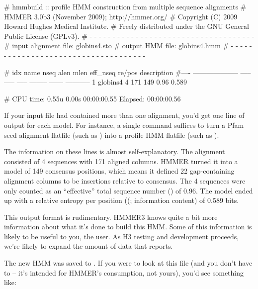 \begin{sreoutput}
# hmmbuild :: profile HMM construction from multiple sequence alignments
# HMMER 3.0b3 (November 2009); http://hmmer.org/
# Copyright (C) 2009 Howard Hughes Medical Institute.
# Freely distributed under the GNU General Public License (GPLv3).
# - - - - - - - - - - - - - - - - - - - - - - - - - - - - - - - - - - - -
# input alignment file:             globins4.sto
# output HMM file:                  globins4.hmm
# - - - - - - - - - - - - - - - - - - - - - - - - - - - - - - - - - - - -

# idx name                  nseq  alen  mlen eff_nseq re/pos description
#---- -------------------- ----- ----- ----- -------- ------ -----------
1     globins4                 4   171   149     0.96  0.589 

# CPU time: 0.55u 0.00s 00:00:00.55 Elapsed: 00:00:00.56
\end{sreoutput}

If your input file had contained more than one alignment, you'd get
one line of output for each model. For instance, a single
 command suffices to turn a Pfam seed alignment
flatfile (such as ) into a profile HMM flatfile
(such as ).

The information on these lines is almost self-explanatory. The
 alignment consisted of 4 sequences with 171 aligned
columns. HMMER turned it into a model of 149 consensus positions,
which means it defined 22 gap-containing alignment columns to be
insertions relative to consensus. The 4 sequences were only counted as
an ``effective'' total sequence number () of 0.96. The
model ended up with a relative entropy per position ((;
information content) of 0.589 bits.

This output format is rudimentary.  HMMER3 knows quite a bit more
information about what it's done to build this HMM. Some of this
information is likely to be useful to you, the user. As H3 testing and
development proceeds, we're likely to expand the amount of data that
 reports.

The new HMM was saved to . If you were to look at
this file (and you don't have to -- it's intended for HMMER's
consumption, not yours), you'd see something like:

